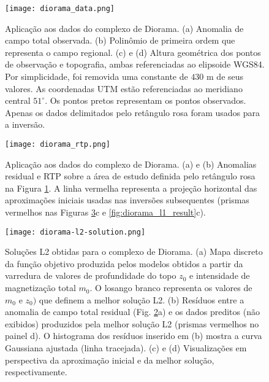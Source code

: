 
\begin{figure}[!htb]
	\texttt{[image: diorama\_data.png]}
	\caption{Aplicação aos dados do complexo de Diorama. 
		(a) Anomalia de campo total observada.
		(b) Polinômio de primeira ordem que representa o campo regional.
		(c) e (d) Altura geométrica dos pontos de observação e topografia,
		ambas referenciadas ao elipsoide WGS84. Por simplicidade, foi removida uma constante de $430$ m de seus valores. As coordenadas UTM estão referenciadas ao meridiano central $51^{\circ}$. Os pontos pretos representam os pontos observados. Apenas os dados delimitados pelo retângulo rosa foram usados para a inversão. 
	}
	\label{fig:diorama_data}
\end{figure}
\pagebreak

\begin{figure}[!htb]
	\texttt{[image: diorama\_rtp.png]}
	\caption{Aplicação aos dados do complexo de Diorama. 
		(a) e (b) Anomalias residual e RTP sobre a área de estudo definida pelo retângulo rosa na Figura \ref{fig:diorama_data}.
		A linha vermelha representa a projeção horizontal das aproximações iniciais usadas nas inversões subsequentes (prismas vermelhos nas Figuras \ref{fig:diorama_l2_result}c e \ref{fig:diorama_l1_result}c).
	}
	\label{fig:diorama_rtp_residual}
\end{figure}

\pagebreak
\begin{figure}[!htb]
	\texttt{[image: diorama-l2-solution.png]}
	\caption{Soluções L2 obtidas para o complexo de Diorama. 
		(a) Mapa discreto da função objetivo produzida pelos modelos obtidos a partir da varredura de valores de profundidade do topo $z_{0}$ e intensidade de magnetização total $m_{0}$. 
		O losango branco representa os valores de $m_{0}$ e $z_{0})$ que definem a melhor solução L2.
		(b) Resíduos entre a anomalia de campo total residual (Fig. \ref{fig:diorama_rtp_residual}a) e os dados preditos (não exibidos) produzidos pela melhor solução L2 (prismas vermelhos no painel d). 
		O histograma dos resíduos inserido em (b) mostra a curva
		Gaussiana ajustada (linha tracejada). 
		(c) e (d) Visualizações em perspectiva da aproximação inicial e da melhor solução, respectivamente.
	}
	\label{fig:diorama_l2_result}
\end{figure}

